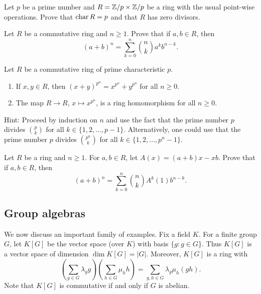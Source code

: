\begin{exercise}
    Let $p$ be a prime number and 
    $R=\mathbb{Z}/p\times\mathbb{Z}/p$ be a ring with the usual point-wise operations. 
    Prove that $\operatorname{char} R=p$ and that $R$ has zero divisors. 
\end{exercise}

\begin{exercise}
    Let $R$ be a commutative ring and $n\geq1$. Prove that
    if $a,b\in R$, then 
    \[
    (a+b)^n=\sum_{k=0}^n\binom{n}{k}a^kb^{n-k}.
    \]
\end{exercise}    

\begin{exercise}
\label{xca:freshman_dream}
    Let $R$ be a commutative ring of prime characteristic $p$. 
    \begin{enumerate}
        \item If $x,y\in R$, then $(x+y)^{p^n}=x^{p^n}+y^{p^n}$ for all $n\geq0$. 
        \item The map $R\to R$, $x\mapsto x^{p^n}$, is a ring homomorphism for all $n\geq0$.
    \end{enumerate}
\end{exercise}

Hint: Proceed by induction on $n$ and use the fact that the prime number $p$ divides 
$\binom{p}{k}$ for all $k\in\{1,2,\dots,p-1\}$. Alternatively, one could use
that the prime number $p$ divides $\binom{p^n}{k}$ for all 
$k\in\{1,2,\dots,p^n-1\}$. 

\begin{bonus}
    Let $R$ be a ring and $n\geq1$. 
    For $a,b\in R$, let $A(x)=(a+b)x-xb$. 
    Prove that
    if $a,b\in R$, then 
    \[
    (a+b)^n=\sum_{k=0}^n\binom{n}{k}A^k(1)b^{n-k}.
    \] 
\end{bonus}

\subsection{Group algebras}

We now discuss an important family of examples. 
Fix a field $K$. 
For a finite group $G$, let $K[G]$ be the vector space (over $K$)
with basis $\{g:g\in G\}$. 
Thus $K[G]$ is a vector space of dimension $\dim K[G]=|G|$.
Moreover, $K[G]$ is a ring
with
\[
\left(\sum_{g\in G}\lambda_gg\right)\left(\sum_{h\in G}\mu_hh\right)
=\sum_{g,h\in G}\lambda_g\mu_h(gh).
\] 
Note that $K[G]$ is commutative if and only if $G$ is abelian. 

